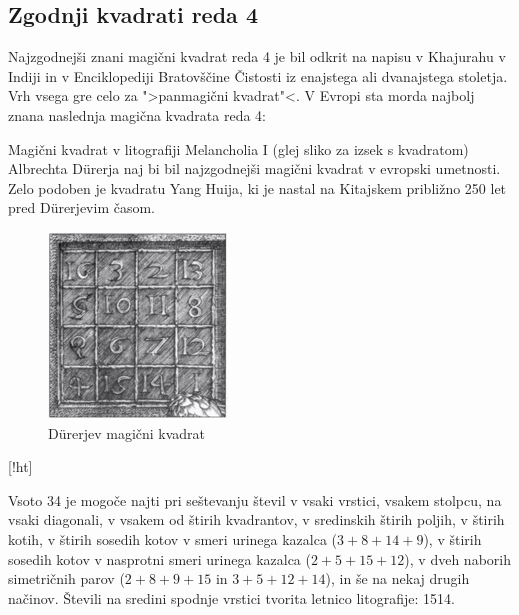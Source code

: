 \documentclass[a4paper,12pt]{article}
\theoremstyle{plain}
\theoremstyle{definition}
\theoremstyle{proof}
\begin{document}
\subsection{Zgodnji kvadrati reda 4}

Najzgodnejši znani magični kvadrat reda 4 je bil odkrit na napisu
v Khajurahu v Indiji in v Enciklopediji Bratovščine Čistosti iz enajstega
ali dvanajstega stoletja. Vrh vsega gre celo za ">panmagični kvadrat"<.
V Evropi sta morda najbolj znana naslednja magična kvadrata reda 4:


Magični kvadrat v litografiji Melancholia I (glej sliko 
za izsek s kvadratom) Albrechta Dürerja naj bi bil najzgodnejši magični kvadrat
v evropski umetnosti. Zelo podoben je kvadratu Yang Huija, ki je nastal na Kitajskem
približno 250 let pred Dürerjevim časom. %

\begin{figure}[!ht]
   \centering
   \includegraphics[scale=1.3]{durer.png}
   \caption{Dürerjev magični kvadrat}
   \label{fig:durer}
 \end{figure}[!ht]



Vsoto 34 je mogoče najti pri seštevanju števil v vsaki vrstici, vsakem stolpcu,
na vsaki diagonali, v vsakem od štirih kvadrantov, v sredinskih štirih poljih,
v štirih kotih, v štirih sosedih kotov v smeri urinega kazalca ($3+8+14+9$), v
štirih sosedih kotov v nasprotni smeri urinega kazalca ($2+5+15+12$), v dveh naborih
simetričnih parov ($2+8+9+15$ in $3+5+12+14$), in še na nekaj drugih načinov.
Števili na sredini spodnje vrstici tvorita letnico litografije: 1514.
%
\end{document}
